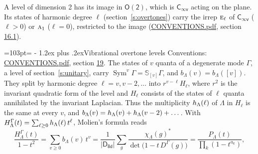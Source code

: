 \documentclass[10pt,a4paper]{article}
\makeatletter
\renewcommand\section{\@startsection{section}{1}{\z@}{-3ex plus -1ex minus -.2ex}%
  {1.2ex plus .2ex}{\normalfont\large\sffamily\bfseries\color{parttitle}}}
\newcommand{\needspace}[1]{\par\penalty-100\begingroup\dimen0=#1\relax\dimen2=\pagegoal
  \advance\dimen2-\pagetotal\ifdim\dimen0>\dimen2\relax\ifdim\dimen2>0pt\vfil\break\fi\fi
  \endgroup}
\numberwithin{equation}{section}
\newcommand{\grp}[1]{\mathsf{#1}}
\newcommand{\irr}[1]{\text{\normalfont\scshape #1}}
\newcommand{\repD}[1]{D^{#1}}
\newcommand{\irchar}[1]{\chi_{#1}}
\newcommand{\conj}[1]{{#1}^{*}}
\newcommand{\schur}[1]{\mathbb{S}_{#1}}
\newcommand{\shape}[1]{[#1]}
\makeatother
\begin{document}
A level of dimension 2 has its image in $\grp{O(2)}$, which is \href{Cinfv.pdf}{$\grp{C_{\infty v}}$} acting on the plane. \label{n:index.harmonic.degree}Its states of harmonic degree $\ell$ (section~\ref{s:overtones}) carry the irrep $\irr{e}_{\ell}$ of \href{Cinfv.pdf}{$\grp{C_{\infty v}}$} ($\ell > 0$) or $\irr{a}_{1}$ ($\ell = 0$), restricted to the image (\href{../../CONVENTIONS.pdf}{CONVENTIONS.pdf}, section \href{../../CONVENTIONS.pdf\#conv.16.1}{16.1}).
\needspace{103pt}
\section{Vibrational overtone levels}\label{s:overtones}
Conventions: \href{../../CONVENTIONS.pdf}{CONVENTIONS.pdf}, section \href{../../CONVENTIONS.pdf\#conv.19}{19}.
\leavevmode\label{n:index.quanta}\label{n:operator.symmetric.power}The states of $v$ quanta of a degenerate mode $\Gamma$, a level of section~\ref{s:unitary}, carry $\operatorname{Sym}^{v}\Gamma = \schur{\shape{v}}\Gamma$, and $b_\Lambda(v) = b_\Lambda(\shape{v})$. \label{n:local.quadratic.form}\label{n:set.harmonic}They split by harmonic degree $\ell = v, v - 2, \dots$ into $r^{v-\ell}H_\ell$, where $r^2$ is the invariant quadratic form of the level and $H_\ell$ consists of the states of $\ell$ quanta annihilated by the invariant Laplacian. \label{n:function.multiplicity.harmonic}Thus the multiplicity $\mathnormal{h}_\Lambda(\ell)$ of $\Lambda$ in $H_\ell$ is the same at every $v$, and $b_\Lambda(v) = \mathnormal{h}_\Lambda(v) + \mathnormal{h}_\Lambda(v - 2) + \dots$. \label{n:function.generating.level}With $H^{\Gamma}_\Lambda(t) = \sum_{\ell\ge0} \mathnormal{h}_\Lambda(\ell)\,t^{\ell}$, Molien's formula reads
\begin{equation}\label{e:molien}\frac{H^{\Gamma}_\Lambda(t)}{1 - t^2} = \sum_{v\ge0} b_\Lambda(v)\,t^v = \frac{1}{|\grp{D_{8d}}|}\sum_{g}\frac{\conj{\irchar{\Lambda}(g)}}{\det\bigl(1 - t\,\repD{\Gamma}(g)\bigr)} = \frac{P_\Lambda(t)}{\prod_k (1-t^{a_k})},\end{equation}
\end{document}
